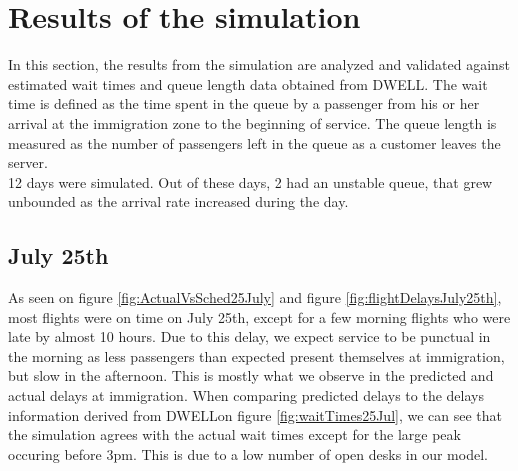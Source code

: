 \documentclass[11pt,onecolumn]{IEEEtran}
\begin{document}
\section{Results of the simulation}
In this section, the results from the simulation are analyzed and validated against estimated wait times and queue length data obtained from DWELL.
The wait time is defined as the time spent in the queue by a passenger from his or her arrival at the immigration zone to the beginning of service. 
The queue length is measured as the number of passengers left in the queue as a customer leaves the server.\\
12 days were simulated. Out of these days, 2 had an unstable queue, that grew unbounded as the arrival rate increased during the day.
\subsection{July 25th}
As seen on figure \ref{fig:ActualVsSched25July} and figure \ref{fig:flightDelaysJuly25th}, most flights were on time on July 25th, except for a few morning flights who were late by almost 10 hours. Due to this delay, we expect service to be punctual in the morning as less passengers than expected present themselves at immigration, but slow in the afternoon.
This is mostly what we observe in the predicted and actual delays at immigration.
When comparing predicted delays to the delays information derived from DWELLon figure \ref{fig:waitTimes25Jul}, we can see that the simulation agrees with the actual wait times except for the large peak occuring before 3pm. This is due to a low number of open desks in our model.
\end{document}
